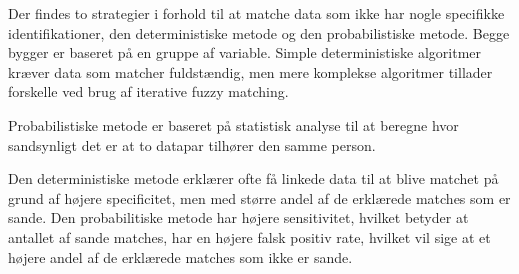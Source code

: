 Der findes to strategier i forhold til at matche data som ikke har nogle specifikke identifikationer, den deterministiske metode og den probabilistiske metode. Begge bygger er baseret på en gruppe af variable. Simple deterministiske algoritmer kræver data som matcher fuldstændig, men mere komplekse algoritmer tillader forskelle ved brug af iterative fuzzy matching. 

Probabilistiske metode er baseret på statistisk analyse til at beregne hvor sandsynligt det er at to datapar tilhører den samme person. 

Den deterministiske metode erklærer ofte få linkede data til at blive matchet på grund af højere specificitet, men med større andel af de erklærede matches som er sande. Den probabilitiske metode har højere sensitivitet, hvilket betyder at antallet af sande matches, har en højere falsk positiv rate, hvilket vil sige at et højere andel af de erklærede matches som ikke er sande.






